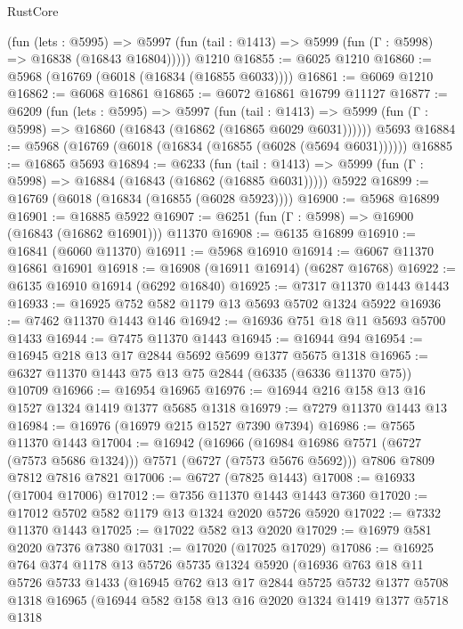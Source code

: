 \begin{lexlean}{RustCore}
\begin{coremodule}
      (fun (lets : @5995) =>
      @5997 (fun (tail : @1413) => @5999 (fun (Γ : @5998) => @16838 (@16843 @16804)))))
    @1210
@16855 := @6025 @1210
@16860 := @5968 (@16769 (@6018 (@16834 (@16855 @6033))))
@16861 := @6069 @1210
@16862 := @6068 @16861
@16865 := @6072 @16861 @16799 @11127
@16877 := @6209
    (fun (lets : @5995) =>
    @5997
      (fun (tail : @1413) =>
      @5999 (fun (Γ : @5998) => @16860 (@16843 (@16862 (@16865 @6029 @6031))))))
    @5693
@16884 := @5968 (@16769 (@6018 (@16834 (@16855 (@6028 (@5694 @6031))))))
@16885 := @16865 @5693
@16894 := @6233
    (fun (tail : @1413) => @5999 (fun (Γ : @5998) => @16884 (@16843 (@16862 (@16885 @6031)))))
    @5922
@16899 := @16769 (@6018 (@16834 (@16855 (@6028 @5923))))
@16900 := @5968 @16899
@16901 := @16885 @5922
@16907 := @6251 (fun (Γ : @5998) => @16900 (@16843 (@16862 @16901))) @11370
@16908 := @6135 @16899
@16910 := @16841 (@6060 @11370)
@16911 := @5968 @16910
@16914 := @6067 @11370 @16861 @16901
@16918 := @16908 (@16911 @16914) (@6287 @16768)
@16922 := @6135 @16910 @16914 (@6292 @16840)
@16925 := @7317 @11370 @1443 @1443
@16933 := @16925 @752 @582 @1179 @13 @5693 @5702 @1324 @5922
@16936 := @7462 @11370 @1443 @146
@16942 := @16936 @751 @18 @11 @5693 @5700 @1433
@16944 := @7475 @11370 @1443
@16945 := @16944 @94
@16954 := @16945 @218 @13 @17 @2844 @5692 @5699 @1377 @5675 @1318
@16965 := @6327 @11370 @1443 @75 @13 @75 @2844 (@6335 (@6336 @11370 @75)) @10709
@16966 := @16954 @16965
@16976 := @16944 @216 @158 @13 @16 @1527 @1324 @1419 @1377 @5685 @1318
@16979 := @7279 @11370 @1443 @13
@16984 := @16976 (@16979 @215 @1527 @7390 @7394)
@16986 := @7565 @11370 @1443
@17004 := @16942
    (@16966 (@16984 @16986 @7571 (@6727 (@7573 @5686 @1324))) @7571 (@6727 (@7573 @5676 @5692)))
    @7806
    @7809
    @7812
    @7816
    @7821
@17006 := @6727 (@7825 @1443)
@17008 := @16933 (@17004 @17006)
@17012 := @7356 @11370 @1443 @1443 @7360
@17020 := @17012 @5702 @582 @1179 @13 @1324 @2020 @5726 @5920
@17022 := @7332 @11370 @1443
@17025 := @17022 @582 @13 @2020
@17029 := @16979 @581 @2020 @7376 @7380
@17031 := @17020 (@17025 @17029)
@17086 := @16925
    @764
    @374
    @1178
    @13
    @5726
    @5735
    @1324
    @5920
    (@16936
      @763
      @18
      @11
      @5726
      @5733
      @1433
      (@16945
        @762
        @13
        @17
        @2844
        @5725
        @5732
        @1377
        @5708
        @1318
        @16965
        (@16944
          @582
          @158
          @13
          @16
          @2020
          @1324
          @1419
          @1377
          @5718
          @1318

\end{coremodule}
\end{lexlean}
